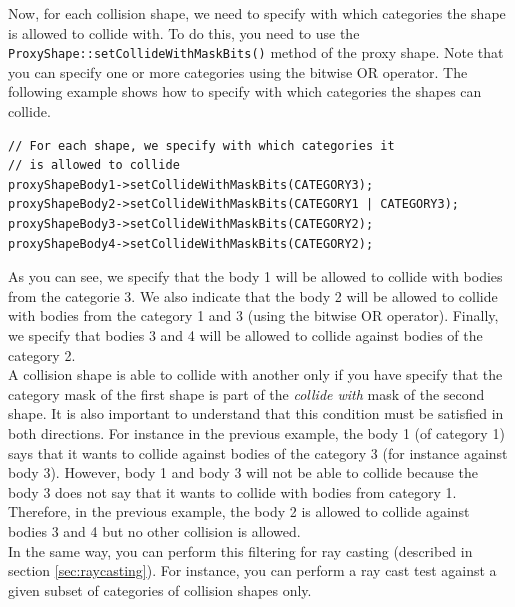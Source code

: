 \documentclass[a4paper,12pt]{article}
\begin{document}
    \begin{sloppypar}
    Now, for each collision shape, we need to specify with which categories the shape is allowed to collide with. To do this, you need to use the \texttt{ProxyShape::setCollideWithMaskBits()}
    method of the proxy shape. Note that you can specify one or more categories using the bitwise OR operator. The following example shows how to specify with which categories the
    shapes can collide. \\
    \end{sloppypar}

    \begin{lstlisting}
// For each shape, we specify with which categories it
// is allowed to collide
proxyShapeBody1->setCollideWithMaskBits(CATEGORY3);
proxyShapeBody2->setCollideWithMaskBits(CATEGORY1 | CATEGORY3);
proxyShapeBody3->setCollideWithMaskBits(CATEGORY2);
proxyShapeBody4->setCollideWithMaskBits(CATEGORY2);
  \end{lstlisting}

    \vspace{0.6cm}

    As you can see, we specify that the body 1 will be allowed to collide with bodies from the categorie 3. We also indicate that the body 2 will be allowed to collide with bodies from the
    category 1 and 3 (using the bitwise OR operator). Finally, we specify that bodies 3 and 4 will be allowed to collide against bodies of the category 2. \\

    A collision shape is able to collide with another only if you have specify that the category mask of the first shape is part of the \emph{collide with} mask of the second shape. It
    is also important to understand that this condition must be satisfied in both directions. For instance in the previous example, the body 1 (of category 1) says that it wants to collide
    against bodies of the category 3 (for instance against body 3). However, body 1 and body 3 will not be able to collide because the body 3 does not say that it wants to collide
    with bodies from category 1. Therefore, in the previous example, the body 2 is allowed to collide against bodies 3 and 4 but no other collision is allowed. \\

    In the same way, you can perform this filtering for ray casting (described in section \ref{sec:raycasting}). For instance, you can perform a ray cast test
    against a given subset of categories of collision shapes only.
\end{document}
